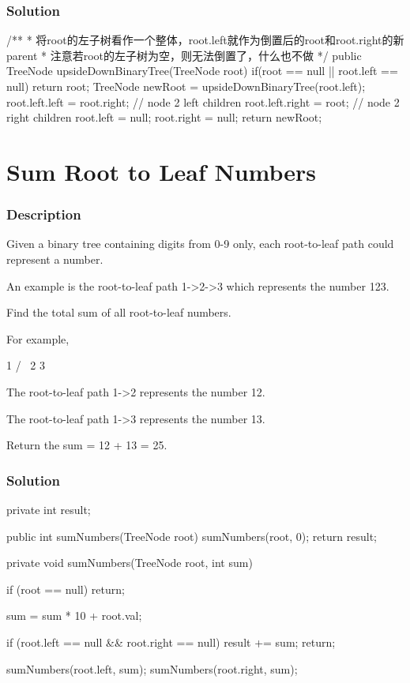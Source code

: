 \subsubsection{Solution}

\begin{Code}
/**
 * 将root的左子树看作一个整体，root.left就作为倒置后的root和root.right的新parent
 * 注意若root的左子树为空，则无法倒置了，什么也不做
 */
public TreeNode upsideDownBinaryTree(TreeNode root) {
    if(root == null || root.left == null) {
        return root;
    }
    TreeNode newRoot = upsideDownBinaryTree(root.left);
    root.left.left = root.right;   // node 2 left children
    root.left.right = root;         // node 2 right children
    root.left = null;
    root.right = null;
    return newRoot;
}
\end{Code}

\newpage

\section{Sum Root to Leaf Numbers} %

\subsubsection{Description}
Given a binary tree containing digits from 0-9 only, each root-to-leaf path could represent a number.

An example is the root-to-leaf path 1->2->3 which represents the number 123.

Find the total sum of all root-to-leaf numbers.

For example,
\begin{Code}
    1
   / \
  2   3
\end{Code}
The root-to-leaf path 1->2 represents the number 12.

The root-to-leaf path 1->3 represents the number 13.

Return the sum = 12 + 13 = 25.
\subsubsection{Solution}

\begin{Code}
private int result;

public int sumNumbers(TreeNode root) {
    sumNumbers(root, 0);
    return result;
}

private void sumNumbers(TreeNode root, int sum) {
    if (root == null) {
        return;
    }

    sum = sum * 10 + root.val;

    if (root.left == null && root.right == null) {
        result += sum;
        return;
    }

    sumNumbers(root.left, sum);
    sumNumbers(root.right, sum);
}
\end{Code}


